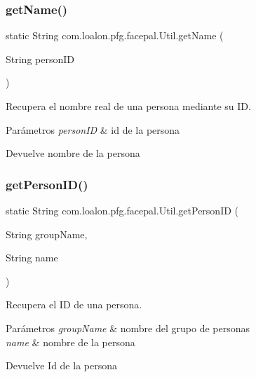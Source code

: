 \subsubsection{\texorpdfstring{get\+Name()}{getName()}}
{\footnotesize\ttfamily static String com.\+loalon.\+pfg.\+facepal.\+Util.\+get\+Name (\begin{DoxyParamCaption}\item[{String}]{person\+ID }\end{DoxyParamCaption})\hspace{0.3cm}{\ttfamily [static]}}



Recupera el nombre real de una persona mediante su ID. 


\begin{DoxyParams}{Parámetros}
{\em person\+ID} & id de la persona \\
\hline
\end{DoxyParams}
\begin{DoxyReturn}{Devuelve}
nombre de la persona 
\end{DoxyReturn}
\mbox{\label{classcom_1_1loalon_1_1pfg_1_1facepal_1_1_util_ab74c33dc6a4bab04e396bce32b5dd62e}} 
\subsubsection{\texorpdfstring{get\+Person\+I\+D()}{getPersonID()}}
{\footnotesize\ttfamily static String com.\+loalon.\+pfg.\+facepal.\+Util.\+get\+Person\+ID (\begin{DoxyParamCaption}\item[{String}]{group\+Name,  }\item[{String}]{name }\end{DoxyParamCaption})\hspace{0.3cm}{\ttfamily [static]}}



Recupera el ID de una persona. 


\begin{DoxyParams}{Parámetros}
{\em group\+Name} & nombre del grupo de personas \\
\hline
{\em name} & nombre de la persona \\
\hline
\end{DoxyParams}
\begin{DoxyReturn}{Devuelve}
Id de la persona 
\end{DoxyReturn}
\mbox{\label{classcom_1_1loalon_1_1pfg_1_1facepal_1_1_util_acedba139e29bc531032abf79980128d2}} 
